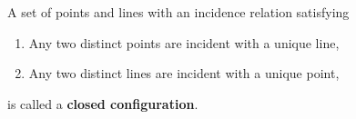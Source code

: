 A set of points and lines with an incidence relation satisfying
\begin{enumerate}
  \item[(i)] Any two distinct points are incident with a unique line,
  \item[(ii)] Any two distinct lines are incident with a unique point,
\end{enumerate}
is called a \textbf{closed configuration}.

